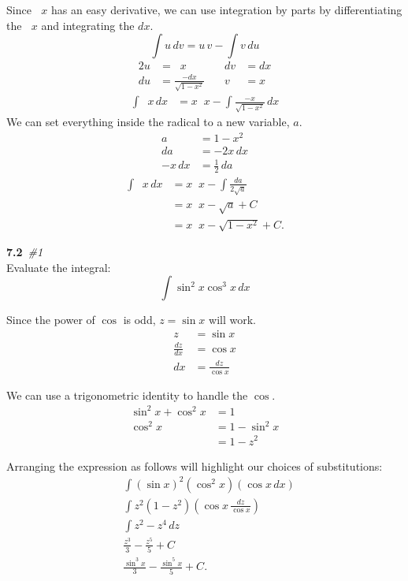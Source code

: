 \documentclass[10pt]{article}
\DeclareMathOperator{\invcos}{cos^{-1}}
\newcommand{\bfit}[2]{\textbf{#1}\ \textit{#2}}
\newcommand{\double}[0]{\par\null\par}
\renewcommand{\section}[2]{\double\LARGE\bfit{#1}{\##2}\normalsize\\}
\newcommand{\paren}[1]{\left({#1}\right)}
\let\xint\int
\renewcommand{\int}[2]{\xint{#1}\,d#2}
\begin{document}
Since $\invcos{x}$ has an easy derivative, we can use integration by parts by differentiating the $\invcos{x}$ and
integrating the $dx$.
%
\begin{equation*}
\int{u}{v}=u\,v-\int{v}{u}
\end{equation*}
%
\begin{alignat*}{2}
u&=\invcos{x} &\quad dv&=dx \\
du&=\frac{-dx}{\sqrt{1-x^2}} &\quad v&=x
\end{alignat*}
%
\begin{align*}
\int{\invcos{x}}{x}&=x\invcos{x}-\int{\frac{-x}{\sqrt{1-x^2}}}{x}
\end{align*}
%
We can set everything inside the radical to a new variable, $a$.
%
\begin{align*}
a&=1-x^2 \\
da&=-2x\,dx \\
-x\,dx&=\frac{1}{2}\,da
\end{align*}
%
\begin{align*}
\int{\invcos{x}}{x}&=x\invcos{x}-\xint{\frac{da}{2\sqrt{a}}} \\
&=x\invcos{x}-\sqrt{a}+C \\
&=x\invcos{x}-\sqrt{1-x^2}+C.
\end{align*}

\section{7.2}{1}
Evaluate the integral:
%
\begin{equation*}
\int{\sin^2{x}\cos^3{x}}{x}
\end{equation*}\double

Since the power of $\cos$ is odd, $z=\sin{x}$ will work.
%
\begin{align*}
z&=\sin{x} \\
\frac{dz}{dx}&=\cos{x} \\
dx&=\frac{dz}{\cos{x}}
\end{align*}

We can use a trigonometric identity to handle the $\cos$.
%
\begin{align*}
\sin^2{x}+\cos^2{x}&=1 \\
\cos^2{x}&=1-\sin^2{x} \\
&=1-z^2
\end{align*}

Arranging the expression as follows will highlight our choices of substitutions:
%
\begin{align*}
&\xint\paren{\sin{x}}^2\paren{\cos^2{x}}\paren{\cos{x}\,dx} \\
&\xint{z}^2\paren{1-z^2}\paren{\cos{x}\,\frac{dz}{\cos{x}}} \\
&\int{z^2-z^4}{z} \\
&\frac{z^3}{3}-\frac{z^5}{5}+C \\
&\frac{\sin^3{x}}{3}-\frac{\sin^5{x}}{5}+C.
\end{align*}
\end{document}
